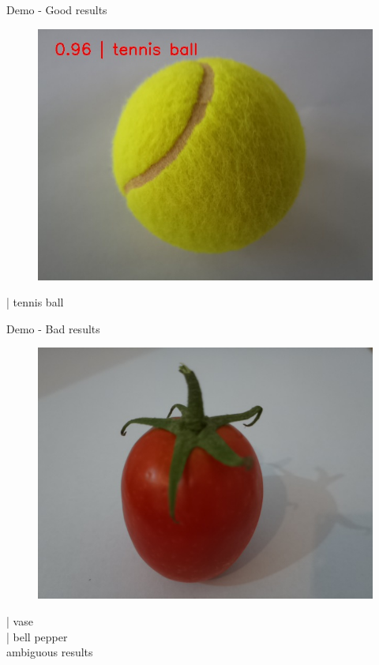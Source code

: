 \begin{frame}{Demo - Good results}
  \begin{figure}
	\includegraphics[width=\linewidth,height=0.5\textheight,keepaspectratio]{images/tennis_ball_output.jpeg}
  \end{figure}
   | tennis ball
\end{frame}

\begin{frame}{Demo - Bad results}
  \begin{figure}
	\includegraphics[width=\linewidth,height=0.5\textheight,keepaspectratio]{../images/tomato.jpeg}
  \end{figure}
   | vase \\
   | bell pepper \\
  \ttfamily ambiguous results
\end{frame}

